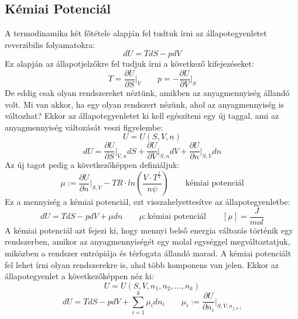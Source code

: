 \documentclass[../main.tex]{subfiles}
\begin{document}
\subsection{Kémiai Potenciál}
A termodinamika két főtétele alapján fel tudtuk írni az állapotegyenletet reverzibilis folyamatokra:
\begin{equation}
    dU = T dS - p dV
\end{equation}
Ez alapján az állapotjelzőkre fel tudjuk írni a következő kifejezéseket:
\begin{equation}
    T = \frac{\partial U}{\partial S}\bigg|_V \qquad p = - \frac{\partial U}{\partial V}\bigg|_S
\end{equation}
De eddig csak olyan rendszereket néztünk, amikben az anyagmennyiség állandó volt. Mi van akkor, ha egy olyan rendszert nézünk, ahol az anyagmennyiség is változhat?
Ekkor az állapotegyenletet ki kell egészíteni egy új taggal, ami az anyagmennyiség változását veszi figyelembe:
\begin{equation}
    U = U(S, V, n)
\end{equation}
\begin{equation}
    dU = \frac{\partial U}{\partial S}\bigg|_{V,n} dS + \frac{\partial U}{\partial V}\bigg|_{S,n} dV + \frac{\partial U}{\partial n}\bigg|_{S,V} dn
\end{equation}
Az új tagot pedig a következőképpen definiáljuk:
\begin{equation}
    \mu := \frac{\partial U}{\partial n}\bigg|_{S,V} - TR \cdot ln{\left(\frac{V \cdot T^{\frac{f}{2}}}{n \psi}\right)} \qquad \text{kémiai potenciál}
\end{equation}
Ez a mennyiség a kémiai potenciál, ezt visszahelyettesítve az állapotegyenletbe:
\begin{equation}
    dU = T dS - p dV + \mu dn \qquad \mu: \text{kémiai potenciál} \qquad \left[\mu\right] = \frac{J}{mol}
\end{equation}
A kémiai potenciál azt fejezi ki, hogy mennyi belső energia változás történik egy rendszerben, amikor az anyagmennyiségét egy molal egységgel megváltoztatjuk,
miközben a rendszer entrópiája és térfogata állandó marad.
\newline
\newline
A kémiai potenciált fel lehet írni olyan rendszerekre is, ahol több komponens van jelen. Ekkor az állapotegyenlet a következőképpen néz ki:
\begin{equation}
    U = U(S, V, n_1, n_2, \dots, n_k)
\end{equation}
\begin{equation}
    dU = T dS - p dV + \sum_{i=1}^{k} \mu_i dn_i \qquad \mu_i := \frac{\partial U}{\partial n_i}\bigg|_{S,V,n_{j \neq i}}
\end{equation}
\end{document}
